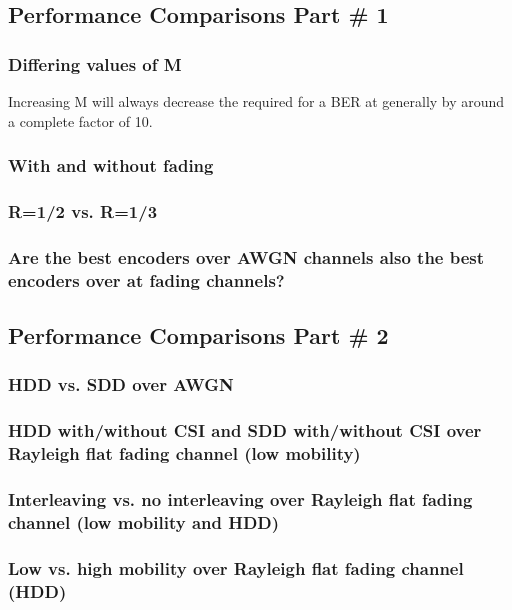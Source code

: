 \documentclass[a4paper,10pt]{article}
\begin{document}
\subsection{Performance Comparisons Part \# 1}

\subsubsection{Differing values of M}
Increasing M will always decrease the required \ebno for a BER at \ber generally by around a complete factor of 10. 
\subsubsection{With and without fading}

\subsubsection{R=1/2 vs. R=1/3}

\subsubsection{Are the best encoders over AWGN channels also the best encoders over at fading
channels?}


\subsection{Performance Comparisons Part \# 2}

\subsubsection{HDD vs. SDD over AWGN}

\subsubsection{HDD with/without CSI and SDD with/without CSI over Rayleigh flat fading channel (low mobility)}

\subsubsection{Interleaving vs. no interleaving over Rayleigh flat fading channel (low mobility and HDD)}

\subsubsection{Low vs. high mobility over Rayleigh flat fading channel (HDD)}


\end{document}
